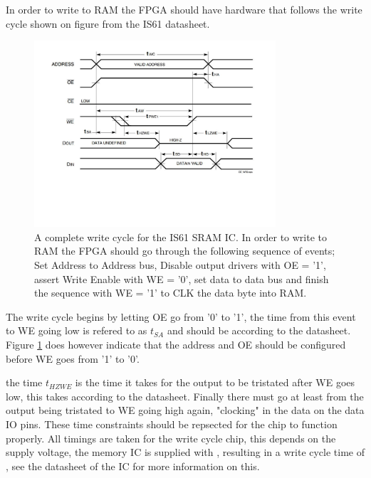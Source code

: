 In order to write to RAM the FPGA should have hardware that follows the write cycle shown on figure  from the IS61 datasheet.
\begin{figure}[H]
    \centering
    \includegraphics[clip, trim=0 150 0 0, width=0.8\textwidth]{Sections/7_SystemDesign/Figures/7_2_5_IS61_WriteCycle.pdf}
    \caption{A complete write cycle for the IS61 SRAM IC\cite{ISSISRAM}. In order to write to RAM the FPGA should go through the following sequence of events; Set Address to Address bus, Disable output drivers with OE = '1', assert Write Enable with WE = '0', set data to data bus and finish the sequence with WE = '1' to CLK the data byte into RAM.}
    \label{fig:7_2_5_IS61_WRITE}
\end{figure}

The write cycle begins by letting OE go from '0' to '1', the time from this event to WE going low is refered to as $t_{SA}$ and should be  according to the datasheet. Figure \ref{fig:7_2_5_IS61_WRITE} does however indicate that the address and OE should be configured before WE goes from '1' to '0'.

the time $t_{HZWE}$ is the time it takes for the output to be tristated after WE goes low, this takes  according to the datasheet. Finally there must go at least  from the output being tristated to WE going high again, "clocking" in the data on the data IO pins. These time constraints should be repsected for the chip to function properly. All timings are taken for the  write cycle chip, this depends on the supply voltage, the memory IC is supplied with , resulting in a write cycle time of , see the datasheet of the IC for more information on this.

